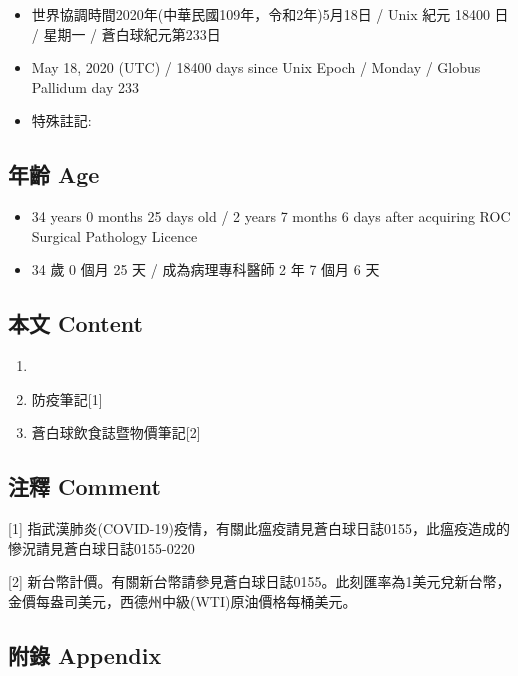 \documentclass[
]{article}
\providecommand{\tightlist}{%
  \setlength{\itemsep}{0pt}\setlength{\parskip}{0pt}}
\begin{document}
\begin{itemize}
\tightlist
\item
  世界協調時間2020年(中華民國109年，令和2年)5月18日 / Unix 紀元 18400 日
  / 星期一 / 蒼白球紀元第233日
\item
  May 18, 2020 (UTC) / 18400 days since Unix Epoch / Monday / Globus
  Pallidum day 233
\item
  特殊註記:
\end{itemize}

\hypertarget{ux5e74ux9f61-age-17}{%
\subsection{年齡 Age}\label{ux5e74ux9f61-age-17}}

\begin{itemize}
\tightlist
\item
  34 years 0 months 25 days old / 2 years 7 months 6 days after
  acquiring ROC Surgical Pathology Licence
\item
  34 歲 0 個月 25 天 / 成為病理專科醫師 2 年 7 個月 6 天
\end{itemize}

\hypertarget{ux672cux6587-content-17}{%
\subsection{本文 Content}\label{ux672cux6587-content-17}}

\begin{enumerate}
\def\labelenumi{\arabic{enumi}.}
\item
\item
  防疫筆記{[}1{]}
\item
  蒼白球飲食誌暨物價筆記{[}2{]}
\end{enumerate}

\hypertarget{ux6ce8ux91cb-comment-17}{%
\subsection{注釋 Comment}\label{ux6ce8ux91cb-comment-17}}

{[}1{]}
指武漢肺炎(COVID-19)疫情，有關此瘟疫請見蒼白球日誌0155，此瘟疫造成的慘況請見蒼白球日誌0155-0220

{[}2{]}
新台幣計價。有關新台幣請參見蒼白球日誌0155。此刻匯率為1美元兌新台幣，金價每盎司美元，西德州中級(WTI)原油價格每桶美元。

\hypertarget{ux9644ux9304-appendix-17}{%
\subsection{附錄 Appendix}\label{ux9644ux9304-appendix-17}}
\end{document}
